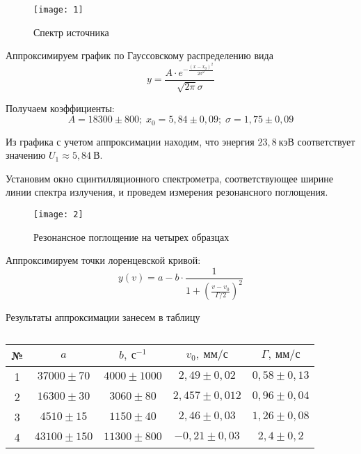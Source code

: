 \documentclass[a4paper, 12pt]{article}
\begin{document}
\begin{figure}[H]
    \texttt{[image: 1]} 
    \caption{Спектр источника}
    \label{fig:1}
\end{figure}

Аппроксимируем график по Гауссовскому распределению вида
\begin{equation}
    y = \frac{A\cdot e ^{ -\frac{(x-x_{0})^2}{2\sigma^2}
    }}{\sqrt{2\pi}\sigma}
    \label{}
\end{equation}

Получаем коэффициенты:
\[
    A = 18300\pm 800;\; x_{0} = 5,84\pm 0,09;\; \sigma = 1,75 \pm 0,09 
\]

Из графика с учетом аппроксимации находим, что энергия $23,8\: кэВ$
соответствует значению $U_{1} \approx 5,84\: В$.

Установим окно сцинтилляционного спектрометра, соответствующее ширине
линии спектра излучения, и проведем измерения резонансного поглощения.


\begin{figure}[H]
    \texttt{[image: 2]} 
    \caption{Резонансное поглощение на четырех образцах}
    \label{fig:2}
\end{figure}

Аппроксимируем точки лоренцевской кривой:
\[
    y(v) = a - b \cdot \frac{1}{1+ \left( \frac{v-v_{0}}{\Gamma/2} \right)^2}
\]

Результаты аппроксимации занесем в таблицу

\renewcommand{\arraystretch}{1.3}

\begin{table}[H]
\centering
\begin{tabular}{|c|c|c|c|c|}
\hline
№ & $a$                            & $b,\: с^{-1}$                           &
$v_{0},\: мм/с$ & $\Gamma,\: мм/с$                            \\ \hline
1 & $37000\pm 70$   & $4000\pm 1000$  & $2,49\pm 0,02$    & $0,58\pm 0,13$  \\ \hline
2 & $16300\pm 30$   & $3060 \pm 80$   & $2,457 \pm 0,012$ & $0,96 \pm 0,04$ \\ \hline
3 & $4510\pm 15$    & $1150 \pm 40$   & $2,46 \pm 0,03$   & $1,26\pm 0,08$  \\ \hline
4 & $43100 \pm 150$ & $11300 \pm 800$ & $-0,21 \pm 0,03$   & $2,4\pm 0,2$    \\ \hline
\end{tabular}
\caption{}
\end{table}
\end{document}
